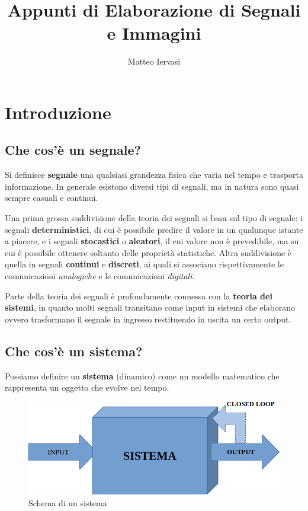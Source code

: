 \documentclass[a4paper, titlepage, oneside]{scrbook}
\title{Appunti di Elaborazione di Segnali e Immagini}
\author{Matteo Iervasi}
\date{ }
\begin{document}
\maketitle

\newpage
	\tableofcontents
\newpage

\chapter{Introduzione}
\section{Che cos'è un segnale?}
Si definisce \textbf{segnale} una qualsiasi grandezza fisica che varia nel tempo e trasporta informazione. 
In generale esistono diversi tipi di segnali, ma in natura sono quasi sempre casuali e continui.

Una prima grossa suddivisione della teoria dei segnali si basa sul tipo di segnale: i segnali \textbf{deterministici}, 
di cui è possibile predire il valore in un qualunque istante a piacere, e i segnali \textbf{stocastici} o \textbf{aleatori}, 
il cui valore non è prevedibile, ma su cui è possibile ottenere soltanto delle proprietà statistiche.
Altra suddivisione è quella in segnali \textbf{continui} e \textbf{discreti}, ai quali si associano rispettivamente le comunicazioni \textit{analogiche} e le comunicazioni \textit{digitali}.

Parte della teoria dei segnali è profondamente connessa con la \textbf{teoria dei sistemi}, in quanto molti segnali transitano come input 
in sistemi che elaborano ovvero trasformano il segnale in ingresso restituendo in uscita un certo output.

\section{Che cos'è un sistema?}
Possiamo definire un \textbf{sistema} (dinamico) come un modello matematico che rappresenta un oggetto che evolve nel tempo.
\begin{figure}[h]
	\centering
	\includegraphics[width=0.7\linewidth]{img/sistema}
	\caption[Schema di un sistema]{Schema di un sistema}
	\label{fig:sistema}
\end{figure}
\end{document}
